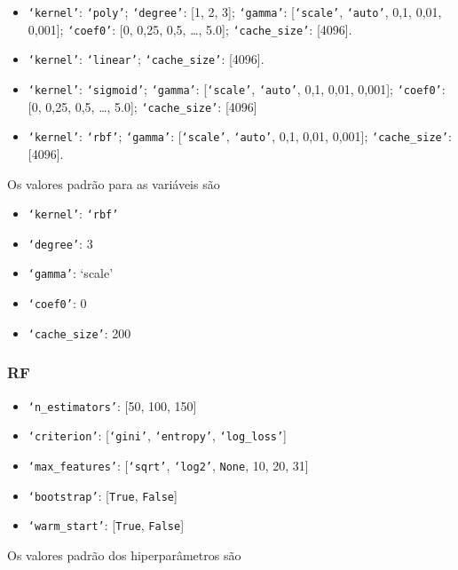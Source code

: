 \begin{itemize}
    \item \texttt{`kernel'}: \texttt{`poly'}; \texttt{`degree'}: [1, 2, 3]; \texttt{`gamma'}: [\texttt{`scale'}, \texttt{`auto'}, 0,1, 0,01, 0,001]; \texttt{`coef0'}: [0, 0,25, 0,5, \dots, 5.0]; \texttt{`cache\_size'}: [4096].
    \item \texttt{`kernel'}: \texttt{`linear'}; \texttt{`cache\_size'}: [4096].
    \item \texttt{`kernel'}: \texttt{`sigmoid'}; \texttt{`gamma'}: [\texttt{`scale'}, \texttt{`auto'}, 0,1, 0,01, 0,001]; \texttt{`coef0'}: [0, 0,25, 0,5, \dots, 5.0]; \texttt{`cache\_size'}: [4096]
    \item \texttt{`kernel'}: \texttt{`rbf'}; \texttt{`gamma'}: [\texttt{`scale'}, \texttt{`auto'}, 0,1, 0,01, 0,001]; \texttt{`cache\_size'}: [4096].
\end{itemize}

Os valores padrão para as variáveis são

\begin{itemize}
    \item \texttt{`kernel'}: \texttt{`rbf'}
    \item \texttt{`degree'}: 3
    \item \texttt{`gamma'}: `scale'
    \item \texttt{`coef0'}: 0
    \item \texttt{`cache\_size'}: 200
\end{itemize}


\subsubsection{RF}\label{subsubsec:rf_hps}

\begin{itemize}
    \item \texttt{`n\_estimators'}: [50, 100, 150]
    \item \texttt{`criterion'}: [\texttt{`gini'}, \texttt{`entropy'}, \texttt{`log\_loss'}]
    \item \texttt{`max\_features'}: [\texttt{`sqrt'}, \texttt{`log2'}, \texttt{None}, 10, 20, 31]
    \item \texttt{`bootstrap'}: [\texttt{True}, \texttt{False}]
    \item \texttt{`warm\_start'}: [\texttt{True}, \texttt{False}]
\end{itemize}

Os valores padrão dos hiperparâmetros são

